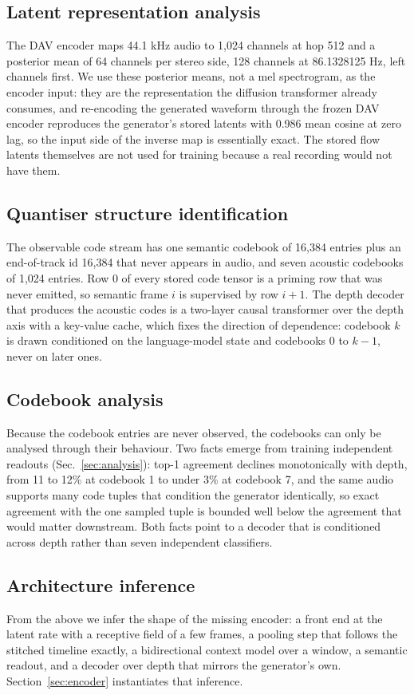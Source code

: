 \subsection{Latent representation analysis}

The DAV encoder maps 44.1 kHz audio to 1,024 channels at hop 512 and a posterior mean of 64 channels per stereo side, 128 channels at 86.1328125 Hz, left channels first. We use these posterior means, not a mel spectrogram, as the encoder input: they are the representation the diffusion transformer already consumes, and re-encoding the generated waveform through the frozen DAV encoder reproduces the generator's stored latents with 0.986 mean cosine at zero lag, so the input side of the inverse map is essentially exact. The stored flow latents themselves are not used for training because a real recording would not have them.

\subsection{Quantiser structure identification}

The observable code stream has one semantic codebook of 16,384 entries plus an end-of-track id 16,384 that never appears in audio, and seven acoustic codebooks of 1,024 entries. Row 0 of every stored code tensor is a priming row that was never emitted, so semantic frame $i$ is supervised by row $i+1$. The depth decoder that produces the acoustic codes is a two-layer causal transformer over the depth axis with a key-value cache, which fixes the direction of dependence: codebook $k$ is drawn conditioned on the language-model state and codebooks $0$ to $k-1$, never on later ones.

\subsection{Codebook analysis}

Because the codebook entries are never observed, the codebooks can only be analysed through their behaviour. Two facts emerge from training independent readouts (Sec.~\ref{sec:analysis}): top-1 agreement declines monotonically with depth, from 11 to 12\% at codebook 1 to under 3\% at codebook 7, and the same audio supports many code tuples that condition the generator identically, so exact agreement with the one sampled tuple is bounded well below the agreement that would matter downstream. Both facts point to a decoder that is conditioned across depth rather than seven independent classifiers.

\subsection{Architecture inference}

From the above we infer the shape of the missing encoder: a front end at the latent rate with a receptive field of a few frames, a pooling step that follows the stitched timeline exactly, a bidirectional context model over a window, a semantic readout, and a decoder over depth that mirrors the generator's own. Section~\ref{sec:encoder} instantiates that inference.
